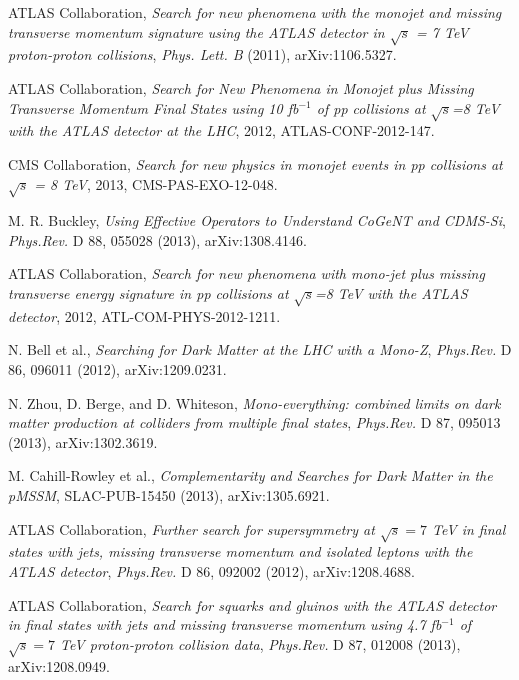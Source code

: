 %
%

ATLAS Collaboration, \emph{Search for new phenomena with the monojet and missing transverse momentum signature using the ATLAS detector in $\sqrt{s}$ = 7 TeV proton-proton collisions}, \emph{Phys. Lett. B} (2011), arXiv:1106.5327.

ATLAS Collaboration, \emph{Search for New Phenomena in Monojet plus Missing Transverse Momentum Final States using 10 fb$^{-1}$ of pp collisions at $\sqrt{s}$=8 TeV with the ATLAS detector at the LHC}, 2012, ATLAS-CONF-2012-147.

CMS Collaboration, \emph{Search for new physics in monojet events in pp collisions at $\sqrt{s}$ = 8 TeV}, 2013, CMS-PAS-EXO-12-048.

M. R. Buckley, \emph{Using Effective Operators to Understand CoGeNT and CDMS-Si}, \emph{Phys.Rev.} D 88, 055028 (2013), arXiv:1308.4146.

ATLAS Collaboration, \emph{Search for new phenomena with mono-jet plus missing transverse energy signature in pp collisions at $\sqrt{s}$=8 TeV with the ATLAS detector}, 2012, ATL-COM-PHYS-2012-1211.

N. Bell et al., \emph{Searching for Dark Matter at the LHC with a Mono-Z}, \emph{Phys.Rev.} D 86, 096011 (2012), arXiv:1209.0231.

N. Zhou, D. Berge, and D. Whiteson, \emph{Mono-everything: combined limits on dark matter production at colliders from multiple final states}, \emph{Phys.Rev.} D 87, 095013 (2013), arXiv:1302.3619.

M. Cahill-Rowley et al., \emph{Complementarity and Searches for Dark Matter in the pMSSM}, SLAC-PUB-15450 (2013), arXiv:1305.6921.

ATLAS Collaboration, \emph{Further search for supersymmetry at $\sqrt{s}=7$ TeV in final states with jets, missing transverse momentum and isolated leptons with the ATLAS detector}, \emph{Phys.Rev.} D 86, 092002 (2012), arXiv:1208.4688.

ATLAS Collaboration, \emph{Search for squarks and gluinos with the ATLAS detector in final states with jets and missing transverse momentum using 4.7 fb$^{-1}$ of $\sqrt{s}=7$ TeV proton-proton collision data}, \emph{Phys.Rev.} D 87, 012008 (2013), arXiv:1208.0949.


